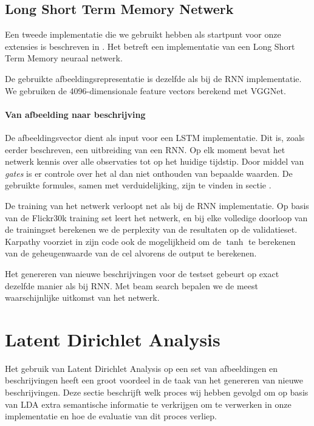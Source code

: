 \subsection{Long Short Term Memory Netwerk}
\label{sec:lstm}
Een tweede implementatie die we gebruikt hebben als startpunt voor onze extensies is beschreven in . Het betreft een implementatie van een Long Short Term Memory neuraal netwerk. 

De gebruikte afbeeldingsrepresentatie is dezelfde als bij de RNN implementatie. We gebruiken de 4096-dimensionale feature vectors berekend met VGGNet. 

\paragraph{Van afbeelding naar beschrijving}
De afbeeldingsvector dient als input voor een LSTM implementatie. Dit is, zoals eerder beschreven, een uitbreiding van een RNN. Op elk moment bevat het netwerk kennis over alle observaties tot op het huidige tijdstip. Door middel van \emph{gates} is er controle over het al dan niet onthouden van bepaalde waarden. De gebruikte formules, samen met verduidelijking, zijn te vinden in sectie .

De training van het netwerk verloopt net als bij de RNN implementatie. Op basis van de Flickr30k training set leert het netwerk, en bij elke volledige doorloop van de trainingset berekenen we de perplexity van de resultaten op de validatieset. Karpathy voorziet in zijn code ook de mogelijkheid om de $\tanh$ te berekenen van de geheugenwaarde van de cel alvorens de output te berekenen. 

Het genereren van nieuwe beschrijvingen voor de testset gebeurt op exact dezelfde manier als bij RNN. Met beam search bepalen we de meest waarschijnlijke uitkomst van het netwerk.



\section{Latent Dirichlet Analysis}
Het gebruik van Latent Dirichlet Analysis op een set van afbeeldingen en beschrijvingen heeft een groot voordeel in de taak van het genereren van nieuwe beschrijvingen. Deze sectie beschrijft welk proces wij hebben gevolgd om op basis van LDA extra semantische informatie te verkrijgen om te verwerken in onze implementatie en hoe de evaluatie van dit proces verliep.

